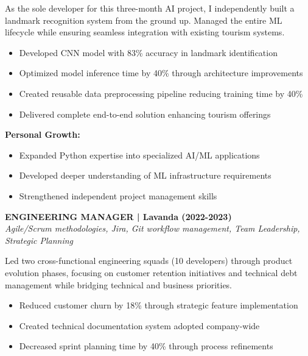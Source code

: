 \documentclass[a4paper,10pt]{article}
\begin{document}
{\begin{minipage}{\dimexpr\textwidth-2\fboxsep\relax}
		As the sole developer for this three-month AI project, I independently built a landmark recognition system from the ground up. Managed the entire ML lifecycle while ensuring seamless integration with existing tourism systems.

		\vspace{0.2cm}
		\begin{itemize}[label=\textcolor{darkblue}{\textbullet}, leftmargin=*, nosep]
			\item Developed CNN model with 83\% accuracy in landmark identification
			\item Optimized model inference time by 40\% through architecture improvements
			\item Created reusable data preprocessing pipeline reducing training time by 40\%
			\item Delivered complete end-to-end solution enhancing tourism offerings
		\end{itemize}

		\vspace{0.2cm}
		\textbf{Personal Growth:}
		\vspace{0.2cm}
		\begin{itemize}[label=\textcolor{darkblue}{\textbullet}, leftmargin=*, nosep]
			\item Expanded Python expertise into specialized AI/ML applications
			\item Developed deeper understanding of ML infrastructure requirements
			\item Strengthened independent project management skills
		\end{itemize}

		\vspace{0.4cm}

		\noindent\textbf{ENGINEERING MANAGER | Lavanda (2022-2023)} \\
		\vspace{0.1cm}
		{\small\textit{Agile/Scrum methodologies, Jira, Git workflow management, Team Leadership, Strategic Planning}}
		\vspace{0.2cm}

		Led two cross-functional engineering squads (10 developers) through product evolution phases, focusing on customer retention initiatives and technical debt management while bridging technical and business priorities.

		\vspace{0.2cm}
		\begin{itemize}[label=\textcolor{darkblue}{\textbullet}, leftmargin=*, nosep]
			\item Reduced customer churn by 18\% through strategic feature implementation
			\item Created technical documentation system adopted company-wide
			\item Decreased sprint planning time by 40\% through process refinements
		\end{itemize}


\end{minipage}}
\end{document}
